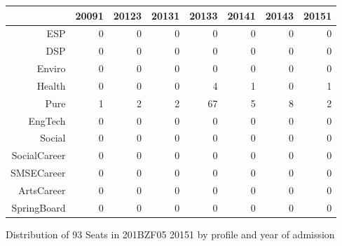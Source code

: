 \documentclass{article}\usepackage[]{graphicx}\usepackage[]{color}
\begin{document}
\begin{figure}[H]
\centering
\begin{tabular}{rrrrrrrr}
  \hline
 & 20091 & 20123 & 20131 & 20133 & 20141 & 20143 & 20151 \\ 
  \hline
ESP &   0 &   0 &   0 &   0 &   0 &   0 &   0 \\ 
  DSP &   0 &   0 &   0 &   0 &   0 &   0 &   0 \\ 
  Enviro &   0 &   0 &   0 &   0 &   0 &   0 &   0 \\ 
  Health &   0 &   0 &   0 &   4 &   1 &   0 &   1 \\ 
  Pure &   1 &   2 &   2 &  67 &   5 &   8 &   2 \\ 
  EngTech &   0 &   0 &   0 &   0 &   0 &   0 &   0 \\ 
  Social &   0 &   0 &   0 &   0 &   0 &   0 &   0 \\ 
  SocialCareer &   0 &   0 &   0 &   0 &   0 &   0 &   0 \\ 
  SMSECareer &   0 &   0 &   0 &   0 &   0 &   0 &   0 \\ 
  ArtsCareer &   0 &   0 &   0 &   0 &   0 &   0 &   0 \\ 
  SpringBoard &   0 &   0 &   0 &   0 &   0 &   0 &   0 \\ 
   \hline
\end{tabular}
\caption{Distribution of 93 Seats in 201BZF05 20151 by profile and year of admission} 
\end{figure}
\end{document}
